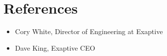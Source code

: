 \section{References}
\begin{itemize}
  \liststyle
  \item{
    Cory White, Director of Engineering at Exaptive\\
  }
  \item{
    Dave King, Exaptive CEO\\
  }
\end{itemize}

